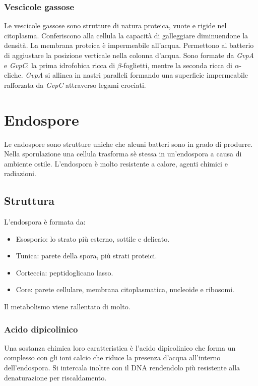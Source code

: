 		\subsubsection{Vescicole gassose}
		Le vescicole gassose sono strutture di natura proteica, vuote e rigide nel citoplasma.
		Conferiscono alla cellula la capacit\`a di galleggiare diminuendone la densit\`a.
		La membrana proteica \`e impermeabile all'acqua.
		Permettono al batterio di aggiustare la posizione verticale nella colonna d'acqua.
		Sono formate da \emph{GvpA} e \emph{GvpC}: la prima idrofobica ricca di $\beta$-foglietti, mentre la seconda ricca di $\alpha$-eliche.
		\emph{GvpA} si allinea in nastri paralleli formando una superficie impermeabile rafforzata da \emph{GvpC} attraverso legami crociati.

\section{Endospore}
Le endospore sono strutture uniche che alcuni batteri sono in grado di produrre.
Nella sporulazione una cellula trasforma s\`e stessa in un'endospora a causa di ambiente ostile.
L'endospora \`e molto resistente a calore, agenti chimici e radiazioni.

	\subsection{Struttura}
	L'endospora \`e formata da:
	\begin{multicols}{2}
		\begin{itemize}
			\item Esosporio: lo strato pi\`u esterno, sottile e delicato.
			\item Tunica: parete della spora, pi\`u strati proteici.
			\item Corteccia: peptidoglicano lasso.
			\item Core: parete cellulare, membrana citoplasmatica, nucleoide e ribosomi.
		\end{itemize}
	\end{multicols}
	Il metabolismo viene rallentato di molto.
	
		\subsubsection{Acido dipicolinico}
		Una sostanza chimica loro caratteristica \`e l'acido dipicolinico che forma un complesso con gli ioni calcio  che riduce la presenza d'acqua all'interno dell'endospora.
		Si intercala inoltre con il DNA rendendolo pi\`u resistente alla denaturazione per riscaldamento.


